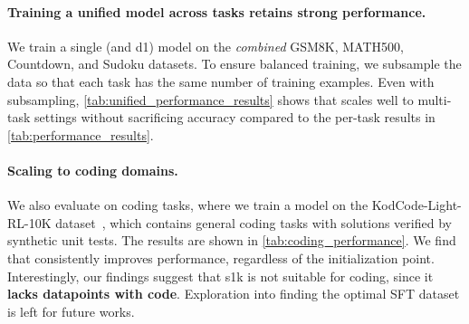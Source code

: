 \begin{minipage}{0.45\textwidth}
\paragraph{Training a unified model across tasks retains strong performance.}
We train a single \grpo{} (and d1) model on the \emph{combined} GSM8K, MATH500, Countdown, and Sudoku datasets. To ensure balanced training, we subsample the data so that each task has the same number of training examples. Even with subsampling, \cref{tab:unified_performance_results} shows that \grpo{} scales well to multi-task settings without sacrificing accuracy compared to the per-task \grpo{} results in \cref{tab:performance_results}.

\vspace{1em}
\paragraph{Scaling \grpo to coding domains.} We also evaluate \grpo on coding tasks, where we train a model on the KodCode-Light-RL-10K dataset~\citep{xu2025kodcode}, which contains general coding tasks with solutions verified by synthetic unit tests. The \grpo{} results are shown in \cref{tab:coding_performance}. We find that \grpo consistently improves performance, regardless of the initialization point. Interestingly, our findings suggest that s1k is not suitable for coding, since it \textbf{lacks datapoints with code}. Exploration into finding the optimal SFT dataset is left for future works.
\end{minipage}
\hfill
